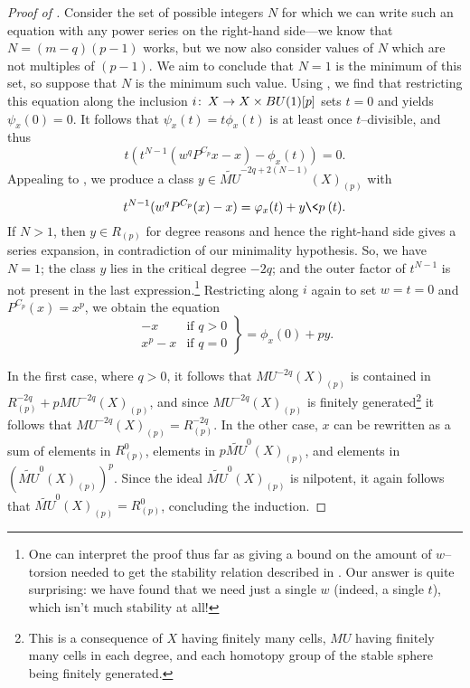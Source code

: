 \begin{proof}[{Proof of }]
Consider the set of possible integers \(N\) for which we can write such an equation with any power series on the right-hand side---we know that \(N = (m-q)(p - 1)\) works, but we now also consider values of \(N\) which are not multiples of \((p - 1)\).  We aim to conclude that \(N = 1\) is the minimum of this set, so suppose that \(N\) is the minimum such value.  Using , we find that restricting this equation along the inclusion \(i\colon\thinspace X \to X \times BU(1)[p]\) sets \(t = 0\) and yields \(\psi_x(0) = 0\).  It follows that \(\psi_x(t) = t \phi_x(t)\) is at least once \(t\)--divisible, and thus \[t (t^{N-1}(w^q P^{C_p}x - x) - \phi_x(t)) = 0.\]  Appealing to , we produce a class \(y \in \widetilde{MU}^{-2q + 2(N-1)}(X)_{(p)}\) with \[t^{N-1}(w^q P^{C_p}(x) - x) = \phi_x(t) + y \<p\>(t).\]  If \(N > 1\), then \(y \in R_{(p)}\) for degree reasons and hence the right-hand side gives a series expansion, in contradiction of our minimality hypothesis.  So, we have \(N = 1\); the class \(y\) lies in the critical degree \(-2q\); and the outer factor of \(t^{N-1}\) is not present in the last expression.\footnote{One can interpret the proof thus far as giving a bound on the amount of \(w\)--torsion needed to get the stability relation described in .  Our answer is quite surprising: we have found that we need just a single \(w\) (indeed, a single \(t\)), which isn't much stability at all!}  Restricting along \(i\) again to set \(w = t = 0\) and \(P^{C_p}(x) = x^p\), we obtain the equation \[\left. \begin{array}{rr} -x & \text{if \(q > 0\)} \\ x^p - x & \text{if \(q = 0\)} \end{array} \right\} = \phi_x(0) + py.\]

In the first case, where \(q > 0\), it follows that \(MU^{-2q}(X)_{(p)}\) is contained in \(R^{-2q}_{(p)} + pMU^{-2q}(X)_{(p)}\), and since \(MU^{-2q}(X)_{(p)}\) is finitely generated\footnote{This is a consequence of \(X\) having finitely many cells, \(MU\) having finitely many cells in each degree, and each homotopy group of the stable sphere being finitely generated.} it follows that \(MU^{-2q}(X)_{(p)} = R^{-2q}_{(p)}\).  In the other case, \(x\) can be rewritten as a sum of elements in \(R^{0}_{(p)}\), elements in \(p \widetilde{MU}^{0}(X)_{(p)}\), and elements in \((\widetilde{MU}^0(X)_{(p)})^p\).  Since the ideal \(\widetilde{MU}^0(X)_{(p)}\) is nilpotent, it again follows that \(\widetilde{MU}^0(X)_{(p)} = R^0_{(p)}\), concluding the induction.
\end{proof}

